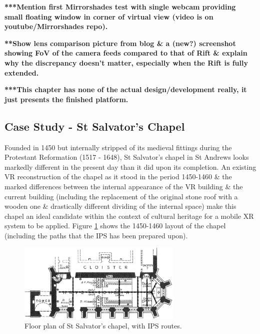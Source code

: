 \textbf{***Mention first Mirrorshades test with single webcam providing small floating window in corner of virtual view (video is on youtube/Mirrorshades repo).}

\textbf{**Show lens comparison picture from blog \& a (new?) screenshot showing FoV of the camera feeds compared to that of Rift \& explain why the discrepancy doesn't matter, especially when the Rift is fully extended.}

\textbf{***This chapter has none of the actual design/development really, it just presents the finished platform.}


\subsection{Case Study - St Salvator's Chapel}
Founded in 1450 but internally stripped of its medieval fittings during the Protestant Reformation (1517 - 1648), St Salvator's chapel in St Andrews looks markedly different in the present day than it did upon its completion. An existing VR reconstruction of the chapel as it stood in the period 1450-1460 \& the marked differences between the internal appearance of the VR building \& the current building (including the replacement of the original stone roof with a wooden one \& drastically different dividing of the internal space) make this chapel an ideal candidate within the context of cultural heritage for a mobile XR system to be applied. Figure \ref{sallies_layout} shows the 1450-1460 layout of the chapel (including the paths that the IPS has been prepared upon).

\begin{figure}[h]
	\begin{center}
		\includegraphics[width=0.7\textwidth]{images/sallies_layout.png}
		\caption{Floor plan of St Salvator's chapel, with IPS routes.}
		\label{sallies_layout}
	\end{center}
\end{figure}

